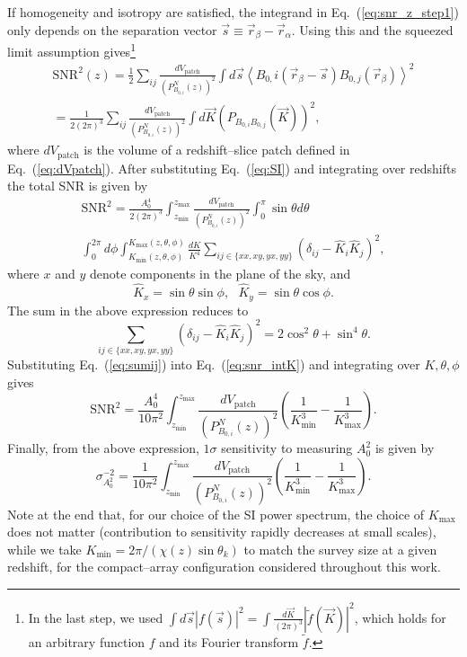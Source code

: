 \documentclass[aps,prd,twocolumn,floatfix,showpacs,superscriptaddress,nofootinbib]{revtex4-1}
\newcommand{\beq}{\begin{equation}}
\newcommand{\eeq}{\end{equation}}
\newcommand{\bga}{\begin{gathered}}
\newcommand{\ega}{\end{gathered}}
\newcommand{\eq}[1]{{Eq.~(#1)}}
\begin{document}
If homogeneity and isotropy are satisfied, the integrand in Eq.~(\ref{eq:snr_z_step1}) only depends on the separation vector $\vec s \equiv \vec r_\beta -\vec r_\alpha$. Using this and the squeezed limit assumption gives\footnote{In the last step, we used $\int d\vec s |f(\vec s)|^2 = \int \frac{d\vec K}{(2\pi)^3}|\widetilde f(\vec K)|^2$, which holds for an arbitrary function $f$ and its Fourier transform $\widetilde f$.}
\beq  
\bga
\text{SNR}^2 (z) = 
\frac{1}{2} \sum_{ij}  \frac{dV_\text{patch}}{{(P^N_{B_{0,i}}(z))^2}}\int d\vec s \left< B_{0,}i(\vec r_\beta - \vec s) B_{0,j}(\vec r_\beta)\right>^2
\\=
\frac{1}{2(2\pi)^3} \sum_{ij}  \frac{dV_\text{patch}}{{(P^N_{B_{0,i}}(z))^2}} \int d\vec K\left(P_{B_{0,i}B_{0,j}}(\vec K)\right)^2,
\ega
\label{eq:snr_z}
\eeq
where $dV_\text{patch}$ is the volume of a redshift--slice patch defined in \eq{\ref{eq:dVpatch}}. After substituting \eq{\ref{eq:SI}} and integrating over redshifts the total SNR is given by
\beq
\bga
\text{SNR}^2 =  \frac{A_0^4}{2(2\pi)^3}  \int_{z_\text{min}}^{z_\text{max}}\frac{dV_\text{patch}}{{(P^N_{B_{0,i}}(z))^2}}
\int_0^{\pi} \sin\theta d\theta \\
\int_0^{2\pi} d\phi\int_{K_\text{min}(z,\theta,\phi)}^{K_\text{max}(z,\theta,\phi)} \frac{d K}{K^4}\sum_{ij\in \{xx, xy, yx, yy\}}(\delta_{ij} - \widehat K_i\widehat K_j)^2,
\ega
\label{eq:snr_intK}
\eeq
where $x$ and $y$ denote components in the plane of the sky, and
\beq
\widehat K_x = \sin\theta\sin\phi, \text{     }
\widehat K_y = \sin\theta\cos\phi.
\label{eq:hat_K_xy}
\eeq
The sum in the above expression reduces to
\beq
\sum_{ij\in \{xx, xy, yx, yy\}}(\delta_{ij} - \widehat K_i\widehat K_j)^2 = 2\cos^2\theta+\sin^4\theta.
\label{eq:sumij}
\eeq
Substituting  Eq.~(\ref{eq:sumij}) into Eq.~(\ref{eq:snr_intK}) and integrating over $K,\theta,\phi$ gives
\beq
\text{SNR}^2 =  \frac{A_0^4}{10\pi^2} \int_{z_\text{min}}^{z_\text{max}}\frac{dV_\text{patch}}{{(P^N_{B_{0,i}}(z))^2}} \left(\frac{1}{K_\text{min}^3}-\frac{1}{K_\text{max}^3}\right).
\label{eq:snr_ints}
\eeq
Finally, from the above expression, $1\sigma$ sensitivity to measuring $A_0^2$ is given by
\beq
\sigma^{-2}_{A_0^2} =  \frac{1}{10\pi^2} \int_{z_\text{min}}^{z_\text{max}}\frac{dV_\text{patch}}{{(P^N_{B_{0,i}}(z))^2}} \left(\frac{1}{K_\text{min}^3}-\frac{1}{K_\text{max}^3}\right).
\label{eq:sigma_A0}
\eeq
Note at the end that, for our choice of the SI power spectrum, the choice of $K_\text{max}$ does not matter (contribution to sensitivity rapidly decreases at small scales), while we take $K_\text{min}=2\pi /(\chi(z)\sin\theta_k)$ to match the survey size at a given redshift, for the compact--array configuration considered throughout this work. 
\end{document}
